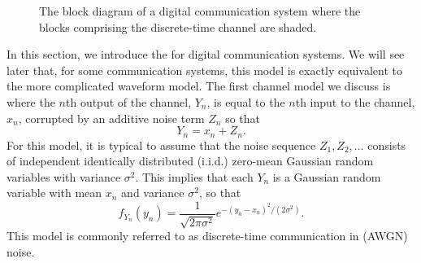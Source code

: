 \begin{figure}
\begin{center}
\scalebox{0.8}
{}
\end{center}
\vspace{-4mm}
\caption{The block diagram of a digital communication system where the blocks comprising the discrete-time channel are shaded.}
\end{figure}

In this section, we introduce the  for digital communication systems.
We will see later that, for some communication systems, this model is exactly equivalent to the more complicated waveform model.
The first channel model we discuss is where the $n$th output of the channel, $Y_n$, is equal to the $n$th input to the channel, $x_n$, corrupted by an additive noise term $Z_n$ so that
\[ Y_n = x_n + Z_n. \]
For this model, it is typical to assume that the noise sequence $Z_1, Z_2, \ldots$ consists of independent identically distributed (i.i.d.) zero-mean Gaussian random variables with variance $\sigma^2$.
This implies that each $Y_n$ is a Gaussian random variable with mean $x_n$ and variance $\sigma^2$, so that
\[ f_{Y_n}(y_n) = \frac{1}{\sqrt{2\pi \sigma^2}} e^{-(y_n - x_n)^2 / (2\sigma^2)}.\]
This model is commonly referred to as discrete-time communication in  (AWGN) noise.


